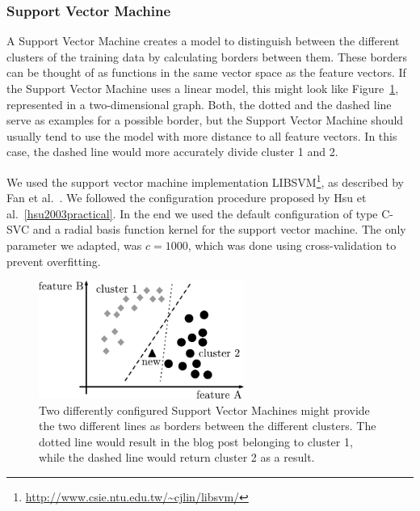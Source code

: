 \subsubsection{Support Vector Machine}
\label{sec:support_vector_machine}


A Support Vector Machine creates a model to distinguish between the different clusters of the training data by calculating borders between them.
These borders can be thought of as functions in the same vector space as the feature vectors.
If the Support Vector Machine uses a linear model, this might look like Figure~\ref{fig:svm}, represented in a two-dimensional graph.
Both, the dotted and the dashed line serve as examples for a possible border, but the Support Vector Machine should usually tend to use the model with more distance to all feature vectors.
In this case, the dashed line would more accurately divide cluster 1 and 2.


We used the support vector machine implementation LIBSVM\footnote{\url{http://www.csie.ntu.edu.tw/~cjlin/libsvm/}}, as described by Fan et al.~\cite{fan2005working}.
We followed the configuration procedure proposed by Hsu et al.~\ref{hsu2003practical}.
In the end we used the default configuration of type C-SVC and a radial basis function kernel for the support vector machine.
The only parameter we adapted, was $c=1000$, which was done using cross-validation to prevent overfitting.

\begin{figure}[h]
    \centering
    \includegraphics[width=0.6\textwidth]{images/svm.pdf}
    \caption{Two differently configured Support Vector Machines might provide the two different lines as borders between the different clusters. The dotted line would result in the blog post belonging to cluster 1, while the dashed line would return cluster 2 as a result.}
    \label{fig:svm}
\end{figure}
